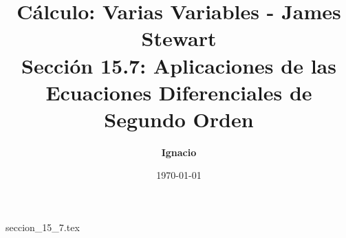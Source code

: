 \documentclass[11pt,spanish,oneside]{report}
\title{\textbf{Cálculo: Varias Variables - James Stewart} \\ \Large Sección 15.7: Aplicaciones de las Ecuaciones Diferenciales de Segundo Orden}
\author{\textbf{Ignacio}}
\date{\today}
\begin{document}
\maketitle

{seccion_15_7.tex}
\end{document}
